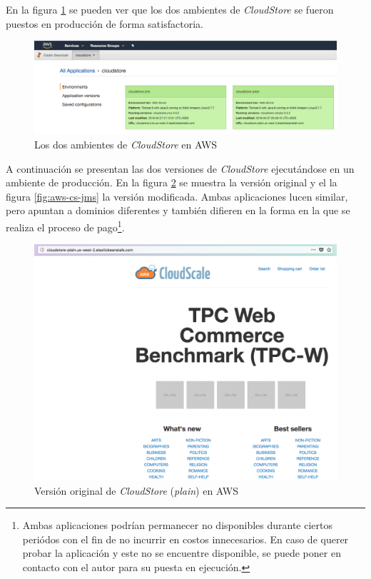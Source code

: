\documentclass[11pt, twoside]{report}
\begin{document}
En la figura \ref{fig:aws-elb} se pueden ver que los dos ambientes de \emph{CloudStore} se fueron puestos en producción de forma satisfactoria.

\begin{figure}[h]
  \centering
  \includegraphics[width=17cm]{aws-elb}
  \caption{\small{Los dos ambientes de \emph{CloudStore} en AWS}}
  \label{fig:aws-elb}
\end{figure}

A continuación se presentan las dos versiones de \emph{CloudStore} ejecutándose en un ambiente de producción. En la figura \ref{fig:aws-cs-plain} se muestra la versión original y el la figura \ref{fig:aws-cs-jms} la versión modificada. Ambas aplicaciones lucen similar, pero apuntan a dominios diferentes y también difieren en la forma en la que se realiza el proceso de pago\footnote{Ambas aplicaciones podrían permanecer no disponibles durante ciertos periódos con el fin de no incurrir en costos innecesarios. En caso de querer probar la aplicación y este no se encuentre disponible, se puede poner en contacto con el autor para su puesta en ejecución.}.

\begin{figure}[h]
  \centering
  \includegraphics[width=14cm]{aws-cs-plain}
  \caption{\small{Versión original de \emph{CloudStore} (\emph{plain}) en AWS}}
  \label{fig:aws-cs-plain}
\end{figure}
\end{document}
